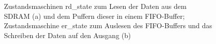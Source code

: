 \documentclass[ngerman,12pt]{article} %
\begin{document}
{\begin{figure}[h!tb]
  \centering
  \qquad
  \caption[Zustandsmaschinen des SINGLE\_LINE\_READ\_BUFFER's]{\label{pic:Zustandsmaschinen des SINGLE_LINE_READ_BUFFER's}Zustandsmaschinen rd\_state zum Lesen der Daten aus dem SDRAM (a) und dem Puffern dieser in einem FIFO-Buffer; Zustandsmaschine er\_state zum Auslesen des FIFO-Buffers und das Schreiben der Daten auf den Ausgang (b)}
\end{figure}

}
\end{document}
